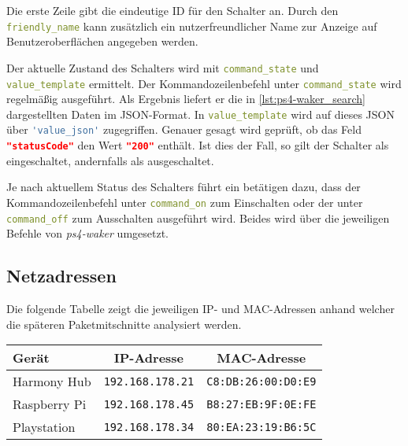 Die erste Zeile gibt die eindeutige ID für den Schalter an.
Durch den \lstinline[language=yaml]{friendly_name} kann zusätzlich ein nutzerfreundlicher Name zur Anzeige auf Benutzeroberflächen angegeben werden.

Der aktuelle Zustand des Schalters wird mit \lstinline[language=yaml]{command_state}
und \\
\lstinline[language=yaml]{value_template} ermittelt.
Der Kommandozeilenbefehl unter \lstinline[language=yaml]{command_state} wird regelmäßig ausgeführt.
Als Ergebnis liefert er die in \autoref{lst:ps4-waker_search} dargestellten Daten im JSON-Format.
In \lstinline[language=yaml]{value_template} wird auf dieses JSON über
\lstinline[language=yaml]{'value_json'} zugegriffen.
Genauer gesagt wird geprüft,
ob das Feld \lstinline[language=json]{"statusCode"} den Wert
\lstinline[language=json]{"200"} enthält.
Ist dies der Fall, so gilt der Schalter als eingeschaltet, andernfalls als ausgeschaltet.



Je nach aktuellem Status des Schalters führt ein betätigen dazu, dass der Kommandozeilenbefehl unter \lstinline[language=yaml]{command_on} zum Einschalten
oder der unter \lstinline[language=yaml]{command_off} zum Ausschalten ausgeführt wird.
Beides wird über die jeweiligen Befehle von \textit{ps4-waker} umgesetzt.

\subsection{Netzadressen}\label{sec:aufbau-adressen}
Die folgende Tabelle zeigt die jeweiligen IP- und MAC-Adressen anhand welcher die
späteren Paketmitschnitte analysiert werden. \\

\begin{center}
    \begin{tabular}{l||c|c}
        Gerät           & IP-Adresse                &  MAC-Adresse          \\
        \hline
        \hline
        Harmony Hub     & \texttt{192.168.178.21}  &  \texttt{C8:DB:26:00:D0:E9}  \\
        \hline
        Raspberry Pi    & \texttt{192.168.178.45}  &  \texttt{B8:27:EB:9F:0E:FE}  \\
        \hline
        Playstation     & \texttt{192.168.178.34}  &  \texttt{80:EA:23:19:B6:5C}   \\
    \end{tabular}
\end{center}

